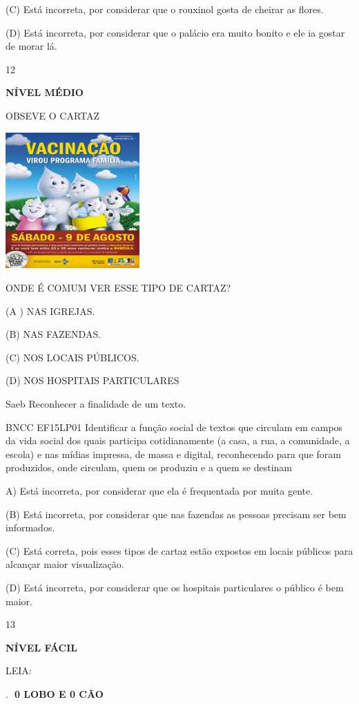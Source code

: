 {{(C) Está incorreta, por considerar que o rouxinol gosta de cheirar as
flores.

(D) Está incorreta, por considerar que o palácio era muito bonito e ele
ia gostar de morar lá.

\num{12}

\textbf{NÍVEL MÉDIO}

OBSEVE O CARTAZ

\includegraphics[width=2.01806in,height=2.05069in]{media/image159.jpeg}

ONDE É COMUM VER ESSE TIPO DE CARTAZ?

(A ) NAS IGREJAS.

(B) NAS FAZENDAS.

(C) NOS LOCAIS PÚBLICOS.

(D) NOS HOSPITAIS PARTICULARES

Saeb Reconhecer a finalidade de um texto.

BNCC EF15LP01 Identificar a função social de textos que circulam em
campos da vida social dos quais participa cotidianamente (a casa, a rua,
a comunidade, a escola) e nas mídias impressa, de massa e digital,
reconhecendo para que foram produzidos, onde circulam, quem os produziu
e a quem se destinam

A) Está incorreta, por considerar que ela é frequentada por muita gente.

(B) Está incorreta, por considerar que nas fazendas as pessoas precisam
ser bem informados.

(C) Está correta, pois esses tipos de cartaz estão expostos em locais
públicos para alcançar maior visualização.

(D) Está incorreta, por considerar que os hospitais particulares o
público é bem maior.

\num{13}

\textbf{NÍVEL FÁCIL}

LEIA:

.~\includegraphics{media/image160.png}\includegraphics{media/image160.png}\textbf{0
LOBO E 0 CÃO}

}}
